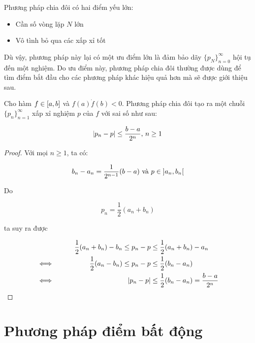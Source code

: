 \documentclass[../../Lectures]{subfiles}
\begin{document}
Phương pháp chia đôi có hai điểm yếu lớn:

\begin{itemize}
    \item Cần số vòng lặp \(N\) lớn
    \item Vô tình bỏ qua các xấp xỉ tốt
\end{itemize}

Dù vậy, phương pháp này lại có một ưu điểm lớn là đảm bảo dãy
\(\{p_N\}_{n=0}^\infty\) hội tụ đến một nghiệm. Do ưu điểm này, phương pháp chia
đôi thường được dùng để tìm điểm bắt đầu cho các phương pháp khác hiệu quả hơn
mà sẽ được giới thiệu sau.

\begin{theorem}
    Cho hàm \(f \in \interval{a}{b}\) và \(f(a) \dot f(b) < 0\). Phương pháp
    chia đôi tạo ra một chuỗi \(\{p_n\}_{n=1}^\infty\) xấp xỉ nghiệm \(p\) của
    \(f\) với sai số như sau:

    \[\abs{p_n - p} \leq \frac{b - a}{2^n} \text{, } n \geq 1\]
\end{theorem}

\begin{proof}
    Với mọi \(n \geq 1\), ta có:

    \[b_n - a_n = \frac{1}{2^{n - 1}} (b - a) \text{ và } p \in \interval[open]{a_n}{b_n}\]

    Do

    \[p_n = \frac{1}{2} (a_n + b_n)\]

    ta suy ra được

    \begin{align*}    %
        &\qquad& \frac{1}{2} (a_n + b_n) - b_n \leq p_n - p &\leq \frac{1}{2} (a_n + b_n) - a_n \\
        \iff&&   \frac{1}{2} (a_n - b_n)       \leq p_n - p &\leq \frac{1}{2} (b_n - a_n)       \\
        \iff&&                                \abs{p_n - p} &\leq \frac{1}{2} (b_n - a_n) = \frac{b - a}{2^n}
    \end{align*}
\end{proof}



\section{Phương pháp điểm bất động}
\end{document}
